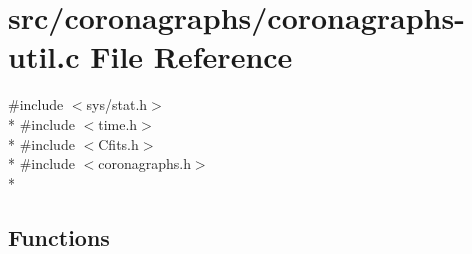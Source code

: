 \hypertarget{src_2coronagraphs_2coronagraphs-util_8c}{\section{src/coronagraphs/coronagraphs-\/util.c File Reference}
\label{src_2coronagraphs_2coronagraphs-util_8c}
}
{\ttfamily \#include $<$sys/stat.\+h$>$}\\*
{\ttfamily \#include $<$time.\+h$>$}\\*
{\ttfamily \#include $<$Cfits.\+h$>$}\\*
{\ttfamily \#include $<$coronagraphs.\+h$>$}\\*
\subsection*{Functions}
